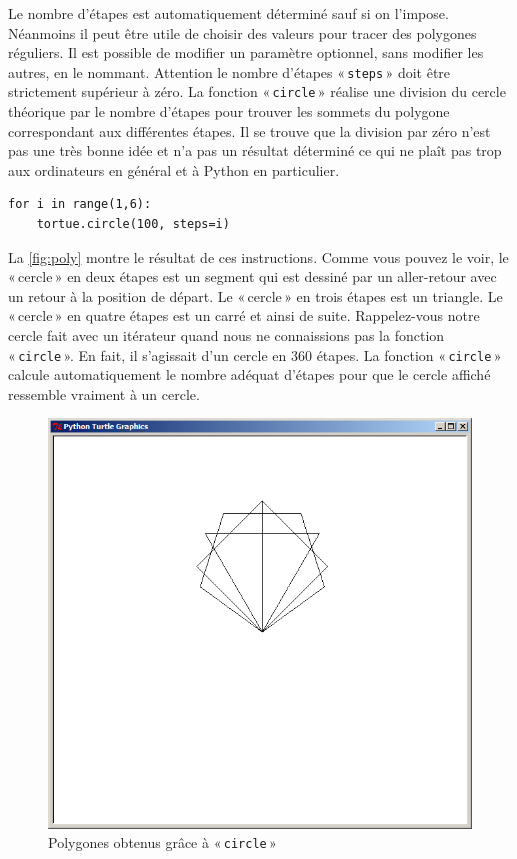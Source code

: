 Le nombre d'étapes est automatiquement déterminé sauf si on l'impose. Néanmoins il peut être utile de choisir des valeurs pour tracer des polygones réguliers. Il est possible de modifier un paramètre optionnel, sans modifier les autres, en le nommant. Attention le nombre d'étapes « \texttt{steps} » doit être strictement supérieur à zéro. La fonction « \texttt{circle} » réalise une division du cercle théorique par le nombre d'étapes pour trouver les sommets du polygone correspondant aux différentes étapes. Il se trouve que la division par zéro n'est pas une très bonne idée et n'a pas un résultat déterminé ce qui ne plaît pas trop aux ordinateurs en général et à Python en particulier.

\begin{Verbatim}[frame=single,rulecolor=\color{mbleu}, label=à taper]
for i in range(1,6):
	tortue.circle(100, steps=i)
\end{Verbatim}


La \autoref{fig:poly} montre le résultat de ces instructions. 
Comme vous pouvez le voir, le « cercle » en deux étapes est un segment qui est dessiné par un aller-retour avec un retour à la position de départ.
Le « cercle » en trois étapes est un triangle. Le « cercle » en quatre étapes est un carré et ainsi de suite. 
Rappelez-vous notre cercle fait avec un itérateur quand nous ne connaissions pas la fonction « \texttt{circle} ».
En fait, il s'agissait d'un cercle en 360 étapes. La fonction « \texttt{circle} » calcule automatiquement le nombre adéquat d'étapes pour que le cercle affiché ressemble vraiment à un cercle.

\begin{figure}[H]
\centering
\includegraphics[scale=0.4]{images/poly}
\caption{Polygones obtenus grâce à « \texttt{circle} »}\label{fig:poly}
\end{figure}

